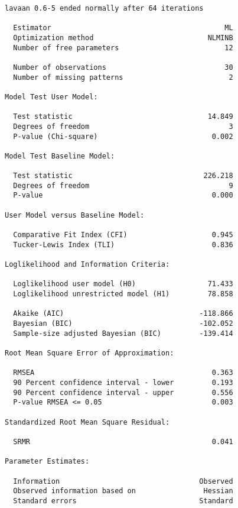 \begin{verbatim}
lavaan 0.6-5 ended normally after 64 iterations

  Estimator                                         ML
  Optimization method                           NLMINB
  Number of free parameters                         12
                                                      
  Number of observations                            30
  Number of missing patterns                         2
                                                      
Model Test User Model:
                                                      
  Test statistic                                14.849
  Degrees of freedom                                 3
  P-value (Chi-square)                           0.002

Model Test Baseline Model:

  Test statistic                               226.218
  Degrees of freedom                                 9
  P-value                                        0.000

User Model versus Baseline Model:

  Comparative Fit Index (CFI)                    0.945
  Tucker-Lewis Index (TLI)                       0.836

Loglikelihood and Information Criteria:

  Loglikelihood user model (H0)                 71.433
  Loglikelihood unrestricted model (H1)         78.858
                                                      
  Akaike (AIC)                                -118.866
  Bayesian (BIC)                              -102.052
  Sample-size adjusted Bayesian (BIC)         -139.414

Root Mean Square Error of Approximation:

  RMSEA                                          0.363
  90 Percent confidence interval - lower         0.193
  90 Percent confidence interval - upper         0.556
  P-value RMSEA <= 0.05                          0.003

Standardized Root Mean Square Residual:

  SRMR                                           0.041

Parameter Estimates:

  Information                                 Observed
  Observed information based on                Hessian
  Standard errors                             Standard


\end{verbatim}
